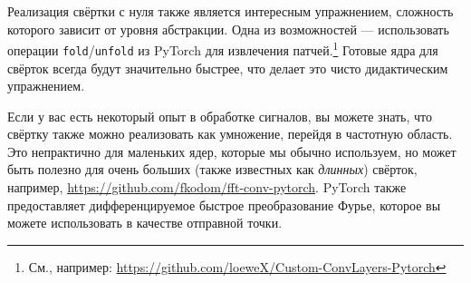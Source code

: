Реализация свёртки с нуля также является интересным упражнением, сложность которого зависит от уровня абстракции. Одна из возможностей — использовать операции \texttt{fold}/\texttt{unfold} из PyTorch для извлечения патчей.\footnote{См., например: \url{https://github.com/loeweX/Custom-ConvLayers-Pytorch}} Готовые ядра для свёрток всегда будут значительно быстрее, что делает это чисто дидактическим упражнением.

Если у вас есть некоторый опыт в обработке сигналов, вы можете знать, что свёртку также можно реализовать как умножение, перейдя в частотную область. Это непрактично для маленьких ядер, которые мы обычно используем, но может быть полезно для очень больших (также известных как \textit{длинных}) свёрток, например, \url{https://github.com/fkodom/fft-conv-pytorch}. PyTorch также предоставляет дифференцируемое быстрое преобразование Фурье, которое вы можете использовать в качестве отправной точки.